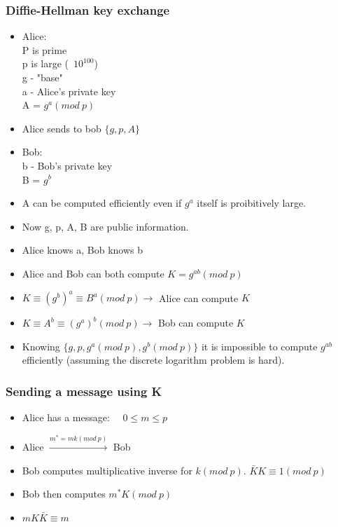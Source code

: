 \documentclass[9pt, letterpaper, oneside]{article}
\begin{document}
\subsubsection{Diffie-Hellman key exchange}
\begin{itemize}
\item Alice:\\
P is prime\\
p is large (~$10^{100}$)\\
g - "base"\\
a - Alice's private key\\
A = $g^a (mod \ p)$\\
\item Alice sends to bob $\{ g, p, A\}$
\item Bob:\\
b - Bob's private key\\
B = $g^b$
\item A can be computed efficiently even if $g^a$ itself is proibitively large.
\item Now g, p, A, B are public information.
\item Alice knows a, Bob knows b
\item Alice and Bob can both compute $K = g^{ab} (mod \ p)$
\item $K \equiv (g^b)^a \equiv B^a (mod \ p) \to$ Alice can compute $K$
\item $K \equiv A^b \equiv (g^a)^b (mod \ p) \to$ Bob can compute $K$
\item Knowing $\{g, p, g^a (mod \ p), g^b (mod \ p)\}$ it is impossible to compute $g^{ab}$ efficiently (assuming the discrete logarithm problem is hard).
\end{itemize}

\subsubsection{Sending a message using K}
\begin{itemize}
\item Alice has a message: $\quad 0 \leq m \leq p$
\item Alice $\xrightarrow{m^* = mk(mod \ p)}$ Bob 
\item Bob computes multiplicative inverse for $k (mod \ p)$.
$\bar{K}K \equiv 1 (mod \ p)$
\item Bob then computes $m^*K (mod \ p)$
\item $mK\bar{K} \equiv m$
\end{itemize}
\end{document}
